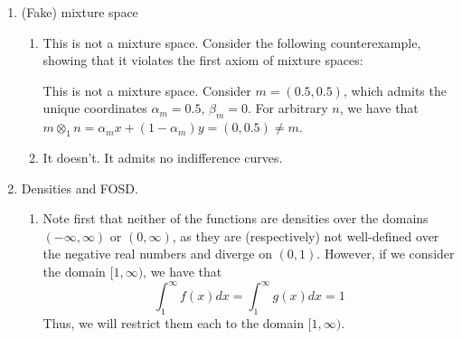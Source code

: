 \documentclass[12pt]{article}
\begin{document}
\begin{enumerate}
\begin{proof}
		Since $\succeq$ has an SEU representation, the expected utility of $f$ is
		\[
		\expect_\mu [u \circ f] = \int_{s\in S} u(f(s)) d\mu(s)
		\]
		To construct the SEU representation of $\sigma_A$, we need a conditional utility function and a conditional belief distribution. The conditional utility function is over outcomes, and will coincide with $u$. Define the conditional belief distribution $\mu(\cdot \mid A)$ as follows, using the definition of conditional probabilities:
		\[
		\mu (B \mid A) = \frac{\mu(B \cap A)}{\mu(A)}
		\]
		Thus, we can show that $\sigma_A$ has an SEU representation as follows. Consider two acts $f,g \in F$. From above, we have that
		\[
		f \succeq_A g \Longleftrightarrow \expect_\mu[u \circ f \mid A] \ge \expect_\mu[u \circ g \mid A]
		\]
		Expanding, we get that
		\[
		f \succeq_A g \Longleftrightarrow \int_{s\in A} u(f(s)) d\mu(s \mid A) \ge \int_{s\in A} u(g(s)) d\mu(s \mid A)
		\]
		The SEU representation for $\sigma_A$ is
		\[
		\expect_\mu[u \circ f \mid A] = \int_{s\in A} u(f(s)) d\mu(s \mid A)
		\]
	\end{proof}
	\item (Fake) mixture space
	\begin{enumerate}
		\item This is not a mixture space. Consider the following counterexample, showing that it violates the first axiom of mixture spaces:
		
		\begin{counterex}
			This is not a mixture space. Consider $m = (0.5,0.5)$, which admits the unique coordinates $\alpha_m = 0.5$, $\beta_m = 0$. For arbitrary $n$, we have that $m \otimes_1 n = \alpha_m x + (1-\alpha_m )y = (0,0.5) \ne m$. 
		\end{counterex}
		\item It doesn't. It admits no indifference curves.
	\end{enumerate}
	\item Densities and FOSD.
	\begin{enumerate}
		\item Note first that neither of the functions are densities over the domains $(-\infty,\infty)$ or $(0,\infty)$, as they are (respectively) not well-defined over the negative real numbers and diverge on $(0,1)$. However, if we consider the domain $[1,\infty)$, we have that
		\[
		\int_1^\infty f(x) dx = \int_1^\infty g(x) dx = 1
		\]
		Thus, we will restrict them each to the domain $[1,\infty)$.
		

\end{enumerate}
\end{enumerate}
\end{document}
